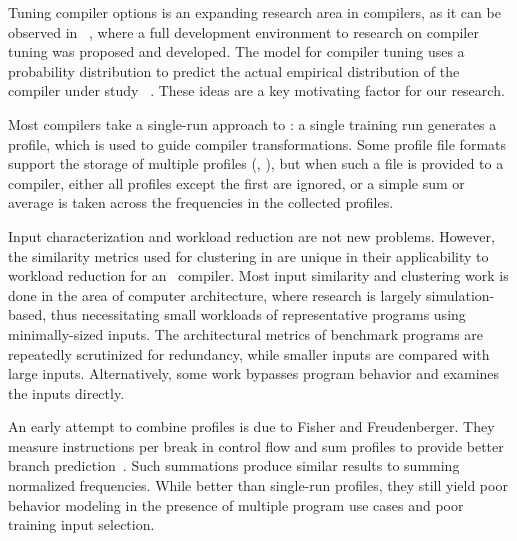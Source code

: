 
Tuning compiler options is an expanding research area in compilers, as
it can be observed in ~\cite{Milepost08}, where a full development
environment to research on compiler tuning was proposed and developed.
The model for compiler tuning uses a probability distribution to predict
the actual empirical distribution of the compiler under study
~\cite{BonillaICML2006}. These ideas are a key motivating factor for
our research.


Most compilers take a single-run approach to \FDO: a single training run
generates a profile, which is used to guide compiler transformations.
Some profile file formats support the storage of multiple profiles
(\eg, \llvm), but when such a file is provided to a compiler, either
all profiles except the first are ignored, or a simple sum or average
is taken across the frequencies in the collected profiles.

Input characterization and workload reduction are not new problems.
However, the similarity metrics used for clustering
in \cite{BerubePhD} are unique in their applicability to
workload reduction for an \FDO\ compiler.  Most input similarity and
clustering work is done in the area of computer architecture, where
research is largely simulation-based, thus necessitating small
workloads of representative programs using minimally-sized inputs. The
architectural metrics of benchmark programs are repeatedly scrutinized
for redundancy, while smaller inputs are compared with large
inputs. Alternatively, some work bypasses program behavior and
examines the inputs directly.

An early attempt to combine profiles is due to Fisher and
Freudenberger. They measure instructions per break in control flow and
sum profiles to provide better branch
prediction~\cite{FisherASPLOS92}.  Such summations produce similar
results to summing normalized frequencies.  While better than
single-run profiles, they still yield poor behavior modeling in the
presence of multiple program use cases and poor training input
selection.

